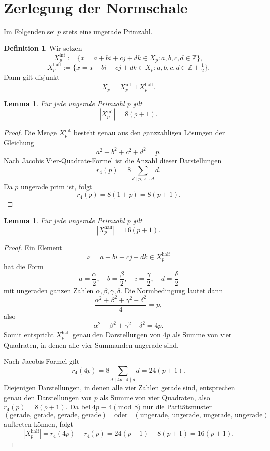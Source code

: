 \documentclass[12pt,a4paper]{article}
\newtheorem{lemma}[satz]{Lemma}
\theoremstyle{definition}
\newtheorem{definition}[satz]{Definition}
\newcommand{\Z}{\mathbb{Z}}
\begin{document}
	\section{Zerlegung der Normschale}
	
	Im Folgenden sei \(p\) stets eine ungerade Primzahl.
	
	\begin{definition}
		Wir setzen
		\[
		X_p^{\mathrm{int}}
		:=
		\{x=a+bi+cj+dk\in X_p: a,b,c,d\in \Z\},
		\]
		\[
		X_p^{\mathrm{half}}
		:=
		\{x=a+bi+cj+dk\in X_p: a,b,c,d\in \Z+\tfrac12\}.
		\]
		Dann gilt disjunkt
		\[
		X_p=X_p^{\mathrm{int}}\sqcup X_p^{\mathrm{half}}.
		\]
	\end{definition}
	
	\begin{lemma}
		Für jede ungerade Primzahl \(p\) gilt
		\[
		|X_p^{\mathrm{int}}|=8(p+1).
		\]
	\end{lemma}
	
	\begin{proof}
		Die Menge \(X_p^{\mathrm{int}}\) besteht genau aus den ganzzahligen Lösungen der Gleichung
		\[
		a^2+b^2+c^2+d^2=p.
		\]
		Nach Jacobis Vier-Quadrate-Formel ist die Anzahl dieser Darstellungen
		\[
		r_4(p)=8\sum_{d\mid p,\;4\nmid d} d.
		\]
		Da \(p\) ungerade prim ist, folgt
		\[
		r_4(p)=8(1+p)=8(p+1).
		\]
	\end{proof}
	
	\begin{lemma}
		Für jede ungerade Primzahl \(p\) gilt
		\[
		|X_p^{\mathrm{half}}|=16(p+1).
		\]
	\end{lemma}
	
	\begin{proof}
		Ein Element
		\[
		x=a+bi+cj+dk\in X_p^{\mathrm{half}}
		\]
		hat die Form
		\[
		a=\frac{\alpha}{2},\quad b=\frac{\beta}{2},\quad c=\frac{\gamma}{2},\quad d=\frac{\delta}{2}
		\]
		mit ungeraden ganzen Zahlen \(\alpha,\beta,\gamma,\delta\). Die Normbedingung lautet dann
		\[
		\frac{\alpha^2+\beta^2+\gamma^2+\delta^2}{4}=p,
		\]
		also
		\[
		\alpha^2+\beta^2+\gamma^2+\delta^2=4p.
		\]
		Somit entspricht \(X_p^{\mathrm{half}}\) genau den Darstellungen von \(4p\) als Summe von vier Quadraten, in denen alle vier Summanden ungerade sind.
		
		Nach Jacobis Formel gilt
		\[
		r_4(4p)=8\sum_{d\mid 4p,\;4\nmid d} d = 24(p+1).
		\]
		Diejenigen Darstellungen, in denen alle vier Zahlen gerade sind, entsprechen genau den Darstellungen von \(p\) als Summe von vier Quadraten, also \(r_4(p)=8(p+1)\). Da bei \(4p\equiv 4 \pmod 8\) nur die Paritätsmuster
		\[
		(\text{gerade, gerade, gerade, gerade})\quad\text{oder}\quad(\text{ungerade, ungerade, ungerade, ungerade})
		\]
		auftreten können, folgt
		\[
		|X_p^{\mathrm{half}}|
		=
		r_4(4p)-r_4(p)
		=
		24(p+1)-8(p+1)
		=
		16(p+1).
		\]
	\end{proof}
	
\end{document}
